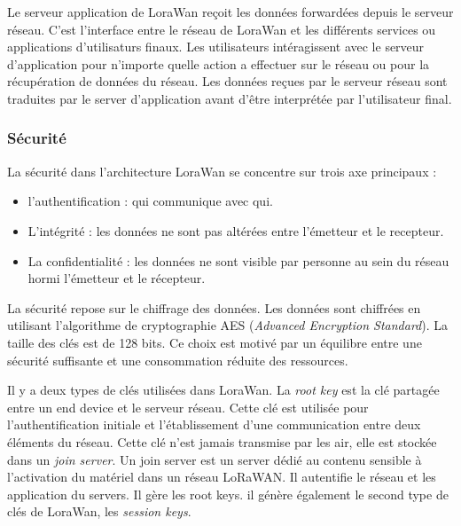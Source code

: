 \vspace{0.1cm}

Le serveur application de LoraWan reçoit les données forwardées depuis le serveur réseau. C'est l'interface entre le réseau de LoraWan et les différents services ou applications d'utilisaturs finaux. Les utilisateurs intéragissent avec le serveur d'application pour n'importe quelle action a effectuer sur le réseau ou pour la récupération de données du réseau. Les données reçues par le serveur réseau sont traduites par le server d'application avant d'être interprétée par l'utilisateur final.

\subsubsection{Sécurité}

La sécurité dans l'architecture LoraWan se concentre sur trois axe principaux :

\begin{itemize}
\item l'authentification : qui communique avec qui.
\item L'intégrité : les données ne sont pas altérées entre l'émetteur et le recepteur.
\item La confidentialité : les données ne sont visible par personne au sein du réseau hormi l'émetteur et le récepteur. 
\end{itemize}

\vspace{0.1cm}

La sécurité repose sur le chiffrage des données. Les données sont chiffrées en utilisant l'algorithme de cryptographie AES (\textit{Advanced Encryption Standard}). La taille des clés est de 128 bits. Ce choix est motivé par un équilibre entre une sécurité suffisante et une consommation réduite des ressources\cite{loraes}.

\vspace{0.1cm}

Il y a deux types de clés utilisées dans LoraWan. La \textit{root key} est la clé partagée entre un end device et le serveur réseau. Cette clé est utilisée pour l'authentification initiale et l'établissement d'une communication entre deux éléments du réseau. Cette clé n'est jamais transmise par les air, elle est stockée dans un \textit{join server}. Un join server est un server dédié au contenu sensible à l'activation du matériel dans un réseau LoRaWAN. Il autentifie le réseau et les application du servers. Il gère les root keys. il génère également le second type de clés de LoraWan, les \textit{session keys}.

